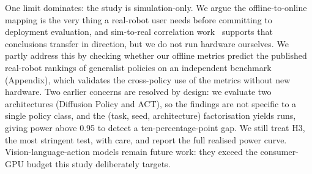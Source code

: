 One limit dominates: the study is simulation-only. We argue the offline-to-online mapping is
the very thing a real-robot user needs before committing to deployment evaluation, and
sim-to-real correlation work~\citep{li2024simpler} supports that conclusions transfer in
direction, but we do not run hardware ourselves. We partly address this by checking whether
our offline metrics predict the published real-robot rankings of generalist policies on an
independent benchmark (Appendix), which validates the cross-policy use of the metrics without
new hardware. Two earlier concerns are resolved by design: we evaluate two architectures
(Diffusion Policy and ACT), so the findings are not specific to a single policy class, and
the (task, seed, architecture) factorisation yields \NRuns{} runs, giving power above 0.95 to
detect a ten-percentage-point gap. We still treat H3, the most stringent test, with care, and
report the full realised power curve. Vision-language-action models remain future work: they
exceed the consumer-GPU budget this study deliberately targets.
